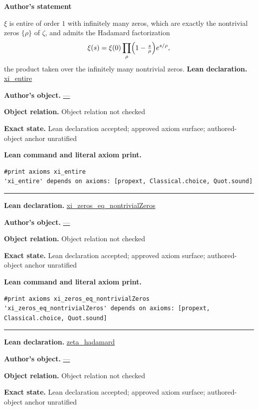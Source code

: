 \documentclass[11pt]{article}
\theoremstyle{plain}
\theoremstyle{definition}
\theoremstyle{remark}
\begin{document}
\begin{tcolorbox}[provenancecard,title={3. Theorem - Infinite Hadamard product; \{\textbackslash{}cite[Ch.\textasciitilde{}2]\{Titchmarsh86\}\}},title after break={3. Theorem - Infinite Hadamard product; \{\textbackslash{}cite[Ch.\textasciitilde{}2]\{Titchmarsh86\}\} (continued)}]
\textbf{Author's statement}\par
$\xi$ is entire of order $1$ with infinitely many zeros, which are exactly the nontrivial zeros
$\{\rho\}$ of $\zeta$, and admits the Hadamard factorization
\[
  \xi(s)=\xi(0)\prod_{\rho}\Bigl(1-\tfrac{s}{\rho}\Bigr)e^{s/\rho},
\]
the product taken over the infinitely many nontrivial zeros.
\tcblower
\textbf{Lean declaration.} \url{xi_entire}
\par\textbf{Author's object.} \url{—}
\par\textbf{Object relation.} Object relation not checked
\par\textbf{Exact state.} Lean declaration accepted; approved axiom surface; authored-object anchor unratified
\par\smallskip\textbf{Lean command and literal axiom print.}
\begin{Verbatim}[breaklines=true,breakanywhere=true,fontsize=\small]
#print axioms xi_entire
'xi_entire' depends on axioms: [propext, Classical.choice, Quot.sound]
\end{Verbatim}
\medskip\hrule\medskip
\textbf{Lean declaration.} \url{xi_zeros_eq_nontrivialZeros}
\par\textbf{Author's object.} \url{—}
\par\textbf{Object relation.} Object relation not checked
\par\textbf{Exact state.} Lean declaration accepted; approved axiom surface; authored-object anchor unratified
\par\smallskip\textbf{Lean command and literal axiom print.}
\begin{Verbatim}[breaklines=true,breakanywhere=true,fontsize=\small]
#print axioms xi_zeros_eq_nontrivialZeros
'xi_zeros_eq_nontrivialZeros' depends on axioms: [propext, Classical.choice, Quot.sound]
\end{Verbatim}
\medskip\hrule\medskip
\textbf{Lean declaration.} \url{zeta_hadamard}
\par\textbf{Author's object.} \url{—}
\par\textbf{Object relation.} Object relation not checked
\par\textbf{Exact state.} Lean declaration accepted; approved axiom surface; authored-object anchor unratified

\end{tcolorbox}
\end{document}
